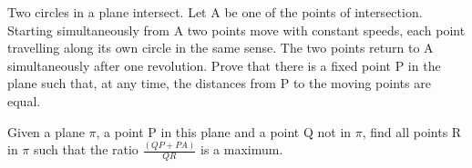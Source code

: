\item Two circles in a plane intersect. Let A be one of the points of intersection. Starting simultaneously from A two points move with constant speeds, each point travelling along its own circle in the same sense. The two points return to A simultaneously after one revolution. Prove that there is a fixed point P in the plane such that, at any time, the distances from P to the moving points are equal.

\item Given a plane $\pi$, a point P in this plane and a point Q not in $\pi$, find all points R in $\pi$ such that the ratio $\frac{(QP + PA)}{QR}$ is a maximum.


